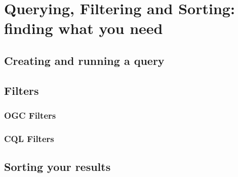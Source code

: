 \chapter{Querying, Filtering and Sorting: finding what you need}\label{filters}
\section{Creating and running a query}
\section{Filters}
\subsection{OGC Filters}
\subsection{CQL Filters}
\section{Sorting your results}